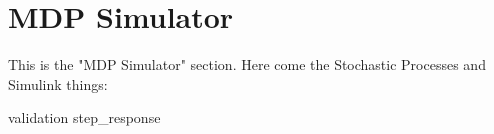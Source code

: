 \section{MDP Simulator}

This is the "MDP Simulator" section. Here come the Stochastic Processes and Simulink things:

{validation}
{step_response}
